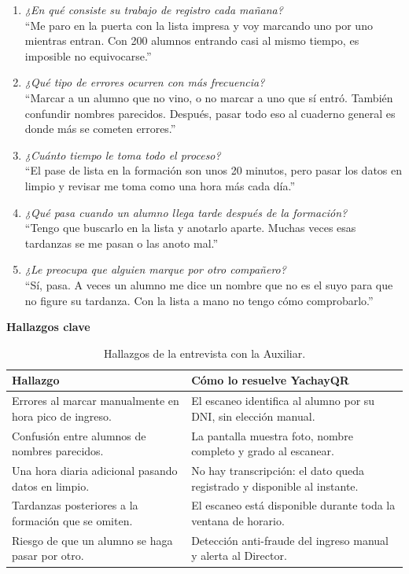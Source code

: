 \documentclass[a4paper,12pt]{article}
\begin{document}
\begin{enumerate}[leftmargin=*, label=\textbf{P\arabic*.}]
  \item \textit{¿En qué consiste su trabajo de registro cada mañana?}\\
  ``Me paro en la puerta con la lista impresa y voy marcando uno por uno
  mientras entran. Con 200 alumnos entrando casi al mismo tiempo, es
  imposible no equivocarse.''

  \item \textit{¿Qué tipo de errores ocurren con más frecuencia?}\\
  ``Marcar a un alumno que no vino, o no marcar a uno que sí entró. También
  confundir nombres parecidos. Después, pasar todo eso al cuaderno general es
  donde más se cometen errores.''

  \item \textit{¿Cuánto tiempo le toma todo el proceso?}\\
  ``El pase de lista en la formación son unos 20 minutos, pero pasar los datos
  en limpio y revisar me toma como una hora más cada día.''

  \item \textit{¿Qué pasa cuando un alumno llega tarde después de la formación?}\\
  ``Tengo que buscarlo en la lista y anotarlo aparte. Muchas veces esas
  tardanzas se me pasan o las anoto mal.''

  \item \textit{¿Le preocupa que alguien marque por otro compañero?}\\
  ``Sí, pasa. A veces un alumno me dice un nombre que no es el suyo para que
  no figure su tardanza. Con la lista a mano no tengo cómo comprobarlo.''
\end{enumerate}

\vspace{0.2cm}
\noindent\textbf{Hallazgos clave}

\begin{table}[H]
\centering
\begin{tabularx}{\linewidth}{p{6.2cm} X}
\toprule
\textbf{Hallazgo} & \textbf{Cómo lo resuelve YachayQR} \\
\midrule
Errores al marcar manualmente en hora pico de ingreso.
& El escaneo identifica al alumno por su DNI, sin elección manual. \\
\addlinespace
Confusión entre alumnos de nombres parecidos.
& La pantalla muestra foto, nombre completo y grado al escanear. \\
\addlinespace
Una hora diaria adicional pasando datos en limpio.
& No hay transcripción: el dato queda registrado y disponible al instante. \\
\addlinespace
Tardanzas posteriores a la formación que se omiten.
& El escaneo está disponible durante toda la ventana de horario. \\
\addlinespace
Riesgo de que un alumno se haga pasar por otro.
& Detección anti-fraude del ingreso manual y alerta al Director. \\
\bottomrule
\end{tabularx}
\caption{Hallazgos de la entrevista con la Auxiliar.}
\end{table}
\end{document}
